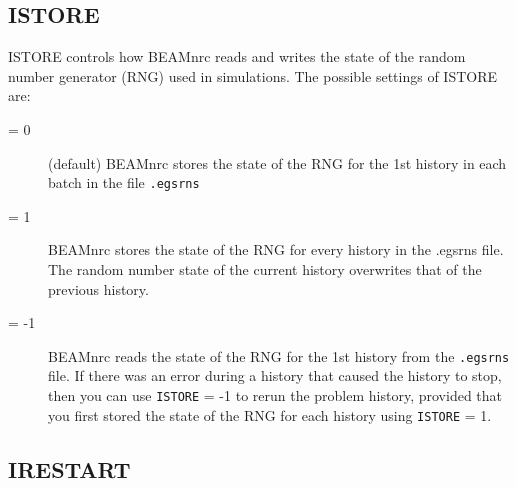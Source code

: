 \documentclass[12pt,twoside]{article}
\begin{document}
\subsection{ISTORE}

ISTORE controls how BEAMnrc reads and writes the state of the random number
generator (RNG) used in simulations.  The possible
settings of ISTORE are:
\begin{description}
\item [= 0] (default) BEAMnrc stores the state of the RNG for the 1st
history in each batch in the file \verb+.egsrns+
\item [= 1] BEAMnrc stores the state of the RNG for every history in the
.egsrns file.  The random number state of the current history overwrites
that of the previous history.
\item [= -1] BEAMnrc reads the state of the RNG for the 1st history
from the \verb+.egsrns+ file.  If there was an error during
a history that caused the history to stop, then you can use {\tt ISTORE} = -1
to rerun the problem history, provided that you first stored the state
of the RNG for each history using {\tt ISTORE} = 1.
\end{description}

\subsection{IRESTART}
\label{IRESTART}
\end{document}
